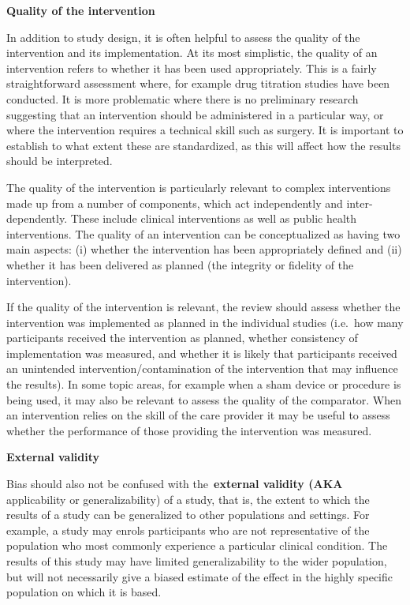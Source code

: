 \documentclass[
  11pt,
  a4paper,
  DIV=11,
  numbers=noendperiod]{scrreprt}
\begin{document}
\textbf{Quality of the intervention}

In addition to study design, it is often helpful to assess the quality
of the intervention and its implementation. At its most simplistic, the
quality of an intervention refers to whether it has been used
appropriately. This is a fairly straightforward assessment where, for
example drug titration studies have been conducted. It is more
problematic where there is no preliminary research suggesting that an
intervention should be administered in a particular way, or where the
intervention requires a technical skill such as surgery. It is important
to establish to what extent these are standardized, as this will affect
how the results should be interpreted.

The quality of the intervention is particularly relevant to complex
interventions made up from a number of components, which act
independently and inter-dependently. These include clinical
interventions as well as public health interventions. The quality of an
intervention can be conceptualized as having two main aspects: (i)
whether the intervention has been appropriately defined and (ii) whether
it has been delivered as planned (the integrity or fidelity of the
intervention).

If the quality of the intervention is relevant, the review should assess
whether the intervention was implemented as planned in the individual
studies (i.e.~how many participants received the intervention as
planned, whether consistency of implementation was measured, and whether
it is likely that participants received an unintended
intervention/contamination of the intervention that may influence the
results). In some topic areas, for example when a sham device or
procedure is being used, it may also be relevant to assess the quality
of the comparator. When an intervention relies on the skill of the care
provider it may be useful to assess whether the performance of those
providing the intervention was measured.

\textbf{External validity}

Bias should also not be confused with the~\textbf{external validity
(AKA} applicability or generalizability) of a study, that is, the extent
to which the results of a study can be generalized to other populations
and settings. For example, a study may enrols participants who are not
representative of the population who most commonly experience a
particular clinical condition. The results of this study may have
limited generalizability to the wider population, but will not
necessarily give a biased estimate of the effect in the highly specific
population on which it is based.~
\end{document}

